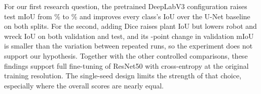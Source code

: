 For our first research question, the pretrained DeepLabV3 configuration raises
test mIoU from \unetTestMiou\% to \deeplabCeTestMiou\% and improves every
class's IoU over the U-Net baseline on both splits. For the second, adding Dice
raises plant IoU but lowers robot and wreck IoU on both validation and test, and
its \diceDeltaMiou{}-point change in validation mIoU is smaller than the
variation between repeated runs, so the experiment does not support our
hypothesis. Together with
the other controlled comparisons, these findings support full fine-tuning of
ResNet50 with cross-entropy at the original training resolution. The
single-seed design limits the strength of that choice, especially where the
overall scores are nearly equal.

